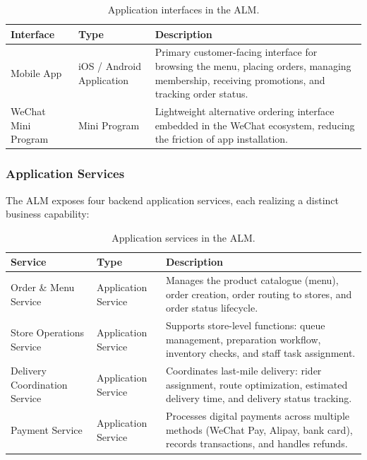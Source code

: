 \documentclass[12pt,a4paper]{article}
\begin{document}
\begin{table}[H]
\centering
\caption{Application interfaces in the ALM.}
\small
\begin{tabularx}{\textwidth}{P{3.2cm}P{2.6cm}Y}
\toprule
\textbf{Interface} & \textbf{Type} & \textbf{Description} \\
\midrule
Mobile App & iOS / Android Application & Primary customer-facing interface for browsing the menu, placing orders, managing membership, receiving promotions, and tracking order status. \\
WeChat Mini Program & Mini Program & Lightweight alternative ordering interface embedded in the WeChat ecosystem, reducing the friction of app installation. \\
\bottomrule
\end{tabularx}
\end{table}


\subsubsection{Application Services}

The ALM exposes four backend application services, each realizing a distinct business capability:

\begin{table}[H]
\centering
\caption{Application services in the ALM.}
\small
\begin{tabularx}{\textwidth}{P{3.2cm}P{2.6cm}Y}
\toprule
\textbf{Service} & \textbf{Type} & \textbf{Description} \\
\midrule
Order \& Menu Service & Application Service & Manages the product catalogue (menu), order creation, order routing to stores, and order status lifecycle. \\
Store Operations Service & Application Service & Supports store-level functions: queue management, preparation workflow, inventory checks, and staff task assignment. \\
Delivery Coordination Service & Application Service & Coordinates last-mile delivery: rider assignment, route optimization, estimated delivery time, and delivery status tracking. \\
Payment Service & Application Service & Processes digital payments across multiple methods (WeChat Pay, Alipay, bank card), records transactions, and handles refunds. \\
\bottomrule
\end{tabularx}
\end{table}
\end{document}
